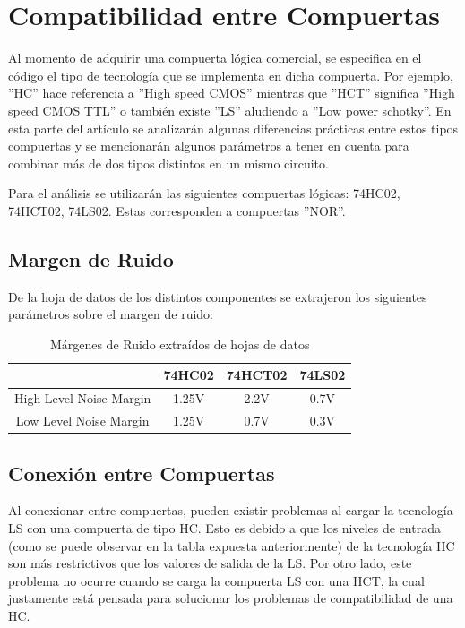 \section{Compatibilidad entre Compuertas}

Al momento de adquirir una compuerta lógica comercial, se especifica
en el código el tipo de tecnología que se implementa en dicha compuerta.
Por ejemplo, ''HC'' hace referencia a ''High speed CMOS'' mientras
que ''HCT'' significa ''High speed CMOS TTL'' o también existe
''LS'' aludiendo a ''Low power schotky''. En esta parte del artículo
se analizarán algunas diferencias prácticas entre estos tipos compuertas
y se mencionarán algunos parámetros a tener en cuenta para combinar
más de dos tipos distintos en un mismo circuito.

Para el análisis se utilizarán las siguientes compuertas lógicas:
74HC02, 74HCT02, 74LS02. Estas corresponden a compuertas ''NOR''.

\subsection{Margen de Ruido}

De la hoja de datos de los distintos componentes se extrajeron los
siguientes parámetros sobre el margen de ruido:

\begin{table}[H]
    \centering
\begin{tabular}{|c|c|c|c|}
\hline 
 & 74HC02 & 74HCT02 & 74LS02\tabularnewline
\hline 
High Level Noise Margin & 1.25V & 2.2V & 0.7V\tabularnewline
\hline 
Low Level Noise Margin & 1.25V & 0.7V & 0.3V\tabularnewline
\hline 
\end{tabular}

\caption{Márgenes de Ruido extraídos de hojas de datos}
\end{table}


\subsection{Conexión entre Compuertas}

Al conexionar entre compuertas, pueden existir problemas al cargar
la tecnología LS con una compuerta de tipo HC. Esto es debido a que
los niveles de entrada (como se puede observar en la tabla expuesta
anteriormente) de la tecnología HC son más restrictivos que los valores
de salida de la LS. Por otro lado, este problema no ocurre cuando
se carga la compuerta LS con una HCT, la cual justamente está pensada
para solucionar los problemas de compatibilidad de una HC.

